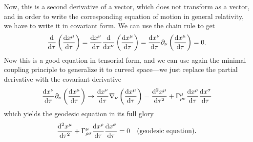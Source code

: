 Now, this is a second derivative of a vector, which does not transform as a vector,
and in order to write the corresponding equation of motion in general relativity,
we have to write it in covariant form. We can use the chain rule to get
\begin{align*}
  \dv{}{\tau} \left( \dv{x^\mu}{\tau} \right) =
  \dv{x^\nu}{\tau} \dv{}{x^\nu} \left( \dv{x^\mu}{\tau} \right) =
  \dv{x^\nu}{\tau} \partial_\nu \left( \dv{x^\mu}{\tau} \right) = 0.
\end{align*}
Now this is a good equation in tensorial form, and we can use again the minimal
coupling principle to generalize it to curved space---we just replace the partial
derivative with the covariant derivative
\begin{align*}
  \dv{x^\nu}{\tau} \partial_\nu \left( \dv{x^\mu}{\tau} \right) \rightarrow
  \dv{x^\nu}{\tau} \nabla_\nu \left( \dv{x^\mu}{\tau} \right) =
  \dv[2]{x^\mu}{\tau} + \Gamma^{\mu}_{\rho\sigma}\dv{x^\rho}{\tau}\dv{x^\sigma}{\tau}
\end{align*}
which yields the geodesic equation in its full glory
\begin{align*}
  \dv[2]{x^\mu}{\tau} + \Gamma^{\mu}_{\rho\sigma}\dv{x^\rho}{\tau}\dv{x^\sigma}{\tau} = 0
  \quad\text{(geodesic equation)}.
\end{align*}

